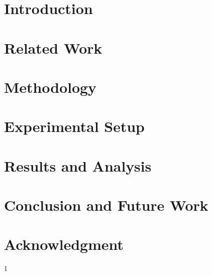 \documentclass[conference]{IEEEtran}
\begin{document}
\title{}

\author{}

\maketitle

\begin{abstract}

\end{abstract}

\begin{IEEEkeywords}

\end{IEEEkeywords}

\section{Introduction}


\section{Related Work}


\section{Methodology}


\section{Experimental Setup}


\section{Results and Analysis}


\section{Conclusion and Future Work}


\section*{Acknowledgment}


\begin{thebibliography}{1}

\end{thebibliography}
\end{document}
